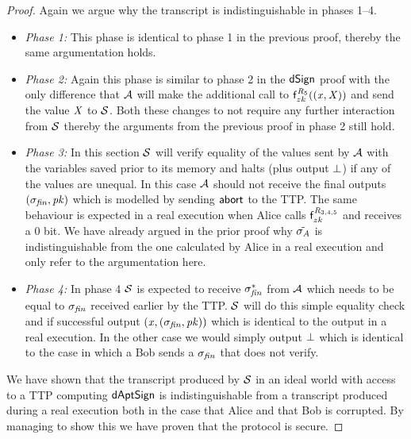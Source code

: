 \begin{proof}
    Again we argue why the transcript is indistinguishable in phases 1--4.
    \begin{itemize}
        \item \textit{Phase 1:} This phase is identical to phase 1 in the previous proof, thereby the same argumentation holds.
        \item \textit{Phase 2:} Again this phase is similar to phase 2 in the $\mathsf{dSign}$ proof with the only difference that $\mathcal{A}$ will make the additional call to $\mathsf{f}^{\mathit{R}_5}_{zk}((\mathit{x}, \mathit{X}))$ and send the value $\mathit{X}$ to $\mathcal{S}$.
        Both these changes to not require any further interaction from $\mathcal{S}$ thereby the arguments from the previous proof in phase 2 still hold.
        \item \textit{Phase 3:} In this section $\mathcal{S}$ will verify equality of the values sent by $\mathcal{A}$ with the variables saved prior to its memory and halts (plus output $\bot$) if any of the values are unequal.
        In this case $\mathcal{A}$ should not receive the final outputs $(\sigma_{\mathit{fin}}, \mathit{pk})$ which is modelled by sending $\mathsf{abort}$ to the TTP.
        The same behaviour is expected in a real execution when Alice calls $\mathsf{f}^{\mathit{R}_{3,4,5}}_{zk}$ and receives a 0 bit.
        We have already argued in the prior proof why $\tilde{\sigma_{\mathit{A}}}$ is indistinguishable from the one calculated by Alice in a real execution and only refer to the argumentation here.
        \item \textit{Phase 4:} In phase 4 $\mathcal{S}$ is expected to receive $\sigma_{\mathit{fin}}^*$ from $\mathcal{A}$ which needs to be equal to $\sigma_{\mathit{fin}}$ received earlier by the TTP.
        $\mathcal{S}$ will do this simple equality check and if successful output $(\mathit{x}, (\sigma_{\mathit{fin}}, \mathit{pk}))$ which is identical to the output in a real execution.
        In the other case we would simply output $\bot$ which is identical to the case in which a Bob sends a $\sigma_{\mathit{fin}}$ that does not verify.
    \end{itemize}

    We have shown that the transcript produced by $\mathcal{S}$ in an ideal world with access to a TTP computing $\mathsf{dAptSign}$ is indistinguishable from a transcript produced during a real execution both in the case that Alice and that Bob is corrupted.
    By managing to show this we have proven that the protocol is secure.
\end{proof}
